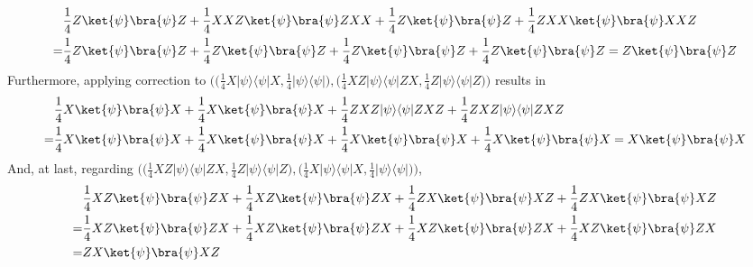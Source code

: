 \begin{equation}
  \begin{split}
    &\frac{1}{4} Z\ket{\psi}\bra{\psi}Z + \frac{1}{4} XXZ\ket{\psi}\bra{\psi}ZXX+ \frac{1}{4} Z\ket{\psi}\bra{\psi}Z + \frac{1}{4} ZXX\ket{\psi}\bra{\psi}XXZ \\
    =& \frac{1}{4} Z\ket{\psi}\bra{\psi}Z + \frac{1}{4} Z\ket{\psi}\bra{\psi}Z + \frac{1}{4} Z\ket{\psi}\bra{\psi}Z + \frac{1}{4} Z\ket{\psi}\bra{\psi}Z =  Z\ket{\psi}\bra{\psi}Z \\
  \end{split}
\end{equation}
Furthermore, applying correction to $\Big(\Big(\frac{1}{4} X|\psi\rangle \langle \psi|X, \frac{1}{4} |\psi\rangle \langle \psi|\Big),\Big(\frac{1}{4} XZ|\psi\rangle \langle \psi|ZX, \frac{1}{4}  Z|\psi\rangle \langle \psi|Z \Big)\Big)$ results in
\begin{equation}
  \begin{split}
    &\frac{1}{4} X\ket{\psi}\bra{\psi}X + \frac{1}{4} X\ket{\psi}\bra{\psi}X + \frac{1}{4} ZXZ|\psi\rangle \langle \psi|ZXZ +  \frac{1}{4}  ZXZ|\psi\rangle \langle \psi|ZXZ \\
    =& \frac{1}{4} X\ket{\psi}\bra{\psi}X + \frac{1}{4} X\ket{\psi}\bra{\psi}X + \frac{1}{4} X\ket{\psi}\bra{\psi}X + \frac{1}{4} X\ket{\psi}\bra{\psi}X = X\ket{\psi}\bra{\psi}X \\	
  \end{split}
\end{equation}
And, at last, regarding $\Big(\Big(\frac{1}{4} XZ|\psi\rangle \langle \psi|ZX, \frac{1}{4} Z|\psi\rangle \langle \psi|Z\Big),\Big(\frac{1}{4} X|\psi\rangle \langle \psi|X, \frac{1}{4}  |\psi\rangle \langle \psi| \Big)\Big)$, 
\begin{equation}
  \begin{split}
    &\frac{1}{4} XZ\ket{\psi}\bra{\psi}ZX + \frac{1}{4} XZ\ket{\psi}\bra{\psi}ZX + \frac{1}{4} ZX\ket{\psi}\bra{\psi}XZ +  \frac{1}{4}  ZX\ket{\psi}\bra{\psi}XZ \\
   = & \frac{1}{4} XZ\ket{\psi}\bra{\psi}ZX + \frac{1}{4} XZ\ket{\psi}\bra{\psi}ZX + \frac{1}{4} XZ\ket{\psi}\bra{\psi}ZX + \frac{1}{4} XZ\ket{\psi}\bra{\psi}ZX \\
   = & ZX\ket{\psi}\bra{\psi}XZ \\
  \end{split}
\end{equation}


